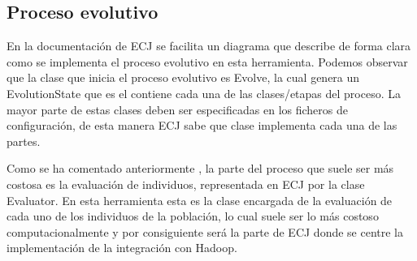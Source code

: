 
\subsection{Proceso evolutivo}

En la documentación de ECJ se facilita un diagrama  que describe de forma clara como se implementa el proceso evolutivo en esta herramienta. Podemos observar que la clase que inicia el proceso evolutivo es Evolve, la cual genera un EvolutionState que es el contiene cada una de las clases/etapas del proceso. La mayor parte de estas clases deben ser especificadas en los ficheros de configuración, de esta manera ECJ sabe que clase implementa cada una de las partes.

Como se ha comentado anteriormente , la parte del proceso que suele ser m\'as costosa es la evaluación de individuos, representada  en ECJ por la clase Evaluator. En esta herramienta esta es la clase encargada de la evaluación de cada uno de los individuos de la población, lo cual suele ser lo m\'as costoso computacionalmente y por consiguiente ser\'a la parte de ECJ donde se centre la implementación de la integración con Hadoop.